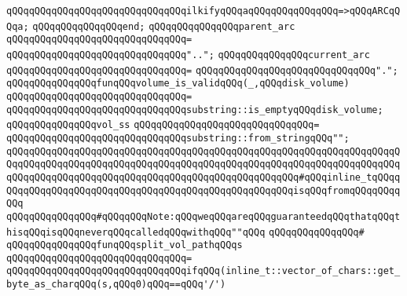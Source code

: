 \verb|qQQqqQQqqQQqqQQqqQQqqQQqqQQqqQQqilkifyqQQqaqQQqqQQqqQQqqQQq=>qQQqARCqQQqa;|\newline
\verb|qQQqqQQqqQQqqQQqend;|\newline
\newline
\verb|qQQqqQQqqQQqqQQqparent_arc|\newline
\verb|qQQqqQQqqQQqqQQqqQQqqQQqqQQqqQQq=|\newline
\verb|qQQqqQQqqQQqqQQqqQQqqQQqqQQqqQQq"..";|\newline
\newline
\verb|qQQqqQQqqQQqqQQqcurrent_arc|\newline
\verb|qQQqqQQqqQQqqQQqqQQqqQQqqQQqqQQq=|\newline
\verb|qQQqqQQqqQQqqQQqqQQqqQQqqQQqqQQq".";|\newline
\newline
\verb|qQQqqQQqqQQqqQQqfunqQQqvolume_is_validqQQq(_,qQQqdisk_volume)|\newline
\verb|qQQqqQQqqQQqqQQqqQQqqQQqqQQqqQQq=|\newline
\verb|qQQqqQQqqQQqqQQqqQQqqQQqqQQqqQQqsubstring::is_emptyqQQqdisk_volume;|\newline
\newline
\verb|qQQqqQQqqQQqqQQqvol_ss|\newline
\verb|qQQqqQQqqQQqqQQqqQQqqQQqqQQqqQQq=|\newline
\verb|qQQqqQQqqQQqqQQqqQQqqQQqqQQqqQQqsubstring::from_stringqQQq"";|\newline
\newline
\verb|qQQqqQQqqQQqqQQqqQQqqQQqqQQqqQQqqQQqqQQqqQQqqQQqqQQqqQQqqQQqqQQqqQQqqQQqqQQqqQQqqQQqqQQqqQQqqQQqqQQqqQQqqQQqqQQqqQQqqQQqqQQqqQQqqQQqqQQqqQQqqQQqqQQqqQQqqQQqqQQqqQQqqQQqqQQqqQQqqQQqqQQqqQQqqQQq#qQQqinline_tqQQqqQQqqQQqqQQqqQQqqQQqqQQqqQQqqQQqqQQqqQQqqQQqqQQqqQQqisqQQqfromqQQqqQQqqQQq|\newline
\newline
\verb|qQQqqQQqqQQqqQQq#qQQqqQQqNote:qQQqweqQQqareqQQqguaranteedqQQqthatqQQqthisqQQqisqQQqneverqQQqcalledqQQqwithqQQq""qQQq|\newline
\verb|qQQqqQQqqQQqqQQq#|\newline
\verb|qQQqqQQqqQQqqQQqfunqQQqsplit_vol_pathqQQqs|\newline
\verb|qQQqqQQqqQQqqQQqqQQqqQQqqQQqqQQq=|\newline
\verb|qQQqqQQqqQQqqQQqqQQqqQQqqQQqqQQqifqQQq(inline_t::vector_of_chars::get_byte_as_charqQQq(s,qQQq0)qQQq==qQQq'/')|\newline
